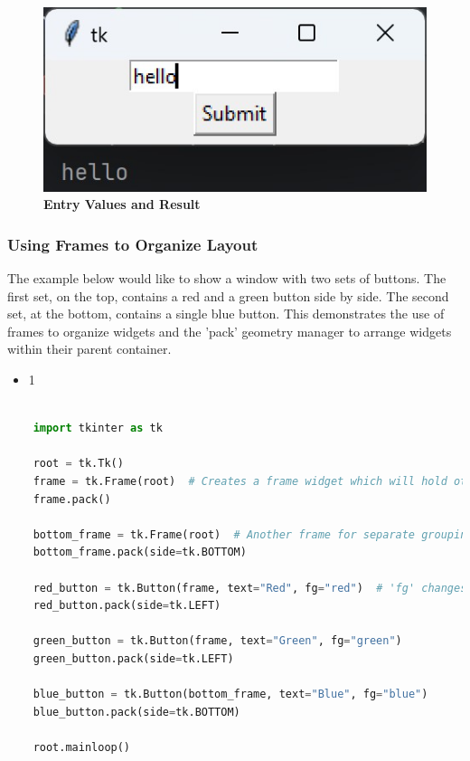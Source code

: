 \begin{figure}[h!]
    \centering
    \includegraphics[width=\textwidth]{Images/TKinter/EntryValueOutput}
    \caption{\textbf{Entry Values and Result}}
\end{figure}

\subsubsection{Using Frames to Organize Layout}

The example below would like to show a window with two sets of buttons. The first set, on the top, contains a red and a green button side by side. The second set, at the bottom, contains a single blue button. This demonstrates the use of frames to organize widgets and the 'pack' geometry manager to arrange widgets within their parent container.

\begin{itemize}
    \item 1
\end{itemize}

\begin{lstlisting}[language=Python]
    
    import tkinter as tk
    
    root = tk.Tk()
    frame = tk.Frame(root)  # Creates a frame widget which will hold other widgets
    frame.pack()
    
    bottom_frame = tk.Frame(root)  # Another frame for separate grouping
    bottom_frame.pack(side=tk.BOTTOM)
    
    red_button = tk.Button(frame, text="Red", fg="red")  # 'fg' changes the button text color
    red_button.pack(side=tk.LEFT)
    
    green_button = tk.Button(frame, text="Green", fg="green")
    green_button.pack(side=tk.LEFT)
    
    blue_button = tk.Button(bottom_frame, text="Blue", fg="blue")
    blue_button.pack(side=tk.BOTTOM)
    
    root.mainloop()
    
\end{lstlisting}

